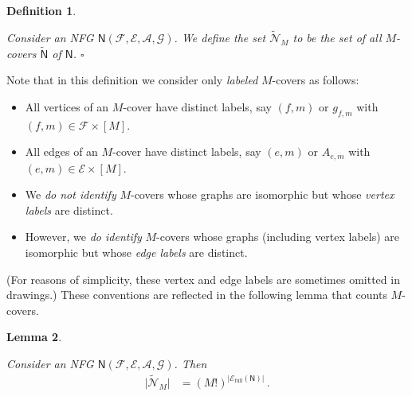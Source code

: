\documentclass[journal, twocolumn]{IEEEtran}
\newcommand{\set}[1]{\mathcal{#1}}
\newcommand{\graph}[1]{\mathsf{#1}}
\newcommand{\setA}{\set{A}}
\newcommand{\setE}{\set{E}}
\newcommand{\setEfull}{\set{E}_{\mathrm{full}}}
\newcommand{\setF}{\set{F}}
\newcommand{\setG}{\set{G}}
\newcommand{\graphN}{\graph{N}}
\newcommand{\cover}[1]{\tilde{#1}}
\newcommand{\cset}[1]{\cover{\set{#1}}}
\newcommand{\cgraph}[1]{\cover{\graph{#1}}}
\newcommand{\card}[1]{\left\lvert #1 \right\rvert}
\newcommand{\cardbig}[1]{\big\lvert #1 \big\rvert}
\newcommand{\?}{\mathrm{?}}
\newcommand{\qedwhite}{\hspace*{\fill}%
  $\square$\smallskip}
\newcommand{\defend}{\qedwhite}
\newtheorem{Lemma}{Lemma}
\newtheorem{Definition}[Lemma]{Definition}
\begin{document}
\begin{Definition}
  \label{def:set:of:graph:covers:1}

  Consider an NFG $\graphN(\setF,\setE, \setA, \setG)$. We define the set
  $\cset{N}_M$ to be the set of all $M$-covers $\cgraph{N}$ of $\graphN$.
  \defend
\end{Definition}


\noindent
Note that in this definition we consider only \emph{labeled} $M$-covers as
follows:
\begin{itemize}

\item All vertices of an $M$-cover have distinct labels, say $(f,m)$ or
  $g_{f,m}$ with $(f,m) \in \setF \times [M]$.

\item All edges of an $M$-cover have distinct labels, say $(e,m)$ or $A_{e,m}$
  with $(e,m) \in \setE \times [M]$.

\item We \emph{do not identify} $M$-covers whose graphs are isomorphic but
  whose \emph{vertex labels} are distinct.

\item However, we \emph{do identify} $M$-covers whose graphs (including vertex
  labels) are isomorphic but whose \emph{edge labels} are distinct.

\end{itemize}
(For reasons of simplicity, these vertex and edge labels are sometimes omitted
in drawings.) These conventions are reflected in the following lemma that
counts $M$-covers.


\begin{Lemma}
  \label{lemma:set:of:graph:covers:1}

  Consider an NFG $\graphN(\setF,\setE, \setA, \setG)$. Then
  \begin{align}
    \cardbig{\cset{N}_M}
      &= (M!)^{\card{\setEfull(\graphN)}} \, .
           \label{eq:number:M:covers:1}
  \end{align}
\end{Lemma}
\end{document}
